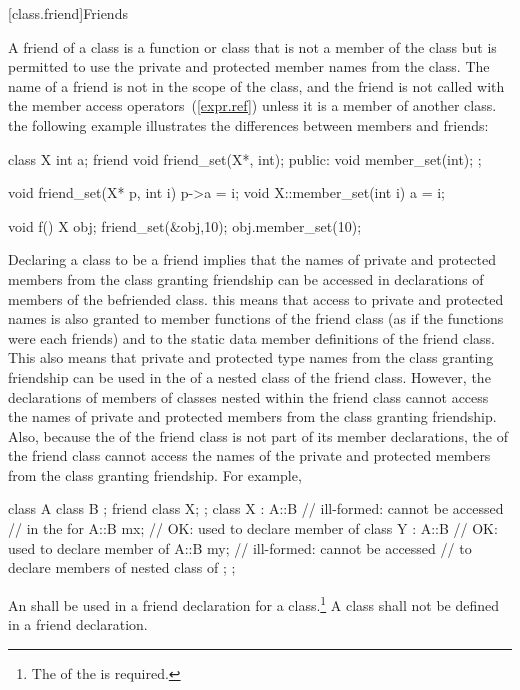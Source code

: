 [class.friend]{Friends}%
%

\pnum
A friend of a class is a function or class that is not a member of the class
but is permitted to use the private and protected member names from the class.
The name of a friend is not in the scope of the class, and the friend is not
called with the member access operators~(\ref{expr.ref}) unless it is a
member of another class.
\enterexample
the following example illustrates the differences between
members and friends:
%
%
%

\begin{codeblock}
class X {
    int a;
    friend void friend_set(X*, int);
public:
    void member_set(int);
};

void friend_set(X* p, int i) { p->a = i; }
void X::member_set(int i) { a = i; }

void f()
{
    X obj;
    friend_set(&obj,10);
    obj.member_set(10);
}
\end{codeblock}
\exitexampleb

\pnum
{}%
Declaring a class to be a friend implies that the names of private and
protected members from the class granting friendship can be accessed in
declarations of members of the befriended class.
\enternote
this means that access to private and protected names is also granted to
member functions of the friend class (as if the functions were each friends)
and to the static data member definitions of the friend class. This also
means that private and protected type names from the class granting friendship
can be used in the  of a nested class of the friend
class. However, the declarations of members of classes nested within the
friend class cannot access the names of private and protected members from
the class granting friendship. Also, because the 
of the friend class is not part of its member declarations, the
 of the friend class cannot access the names of the
private and protected members from the class granting friendship. For example,

\begin{codeblock}
class A {
	class B { };
	friend class X;
};
class X : A::B {		// ill-formed:  cannot be accessed
				// in the  for 
	A::B mx;		// OK:  used to declare member of 
	class Y : A::B {	// OK:  used to declare member of 
		A::B my;	// ill-formed:  cannot be accessed
				// to declare members of nested class of 
	};
};
\end{codeblock}
\exitnote
An  shall be used in a friend
declaration for a class.\footnote{The  of the
 is required.} A class shall not be
defined in a friend declaration.
\enterexample

